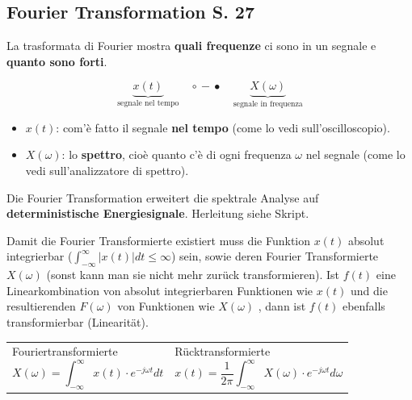 \subsection{Fourier Transformation S. 27}

La trasformata di Fourier mostra \textbf{quali frequenze} ci sono in un segnale
e \textbf{quanto sono forti}.

\[
\underbrace{x(t)}_{\text{segnale nel tempo}}
\quad \circ\!\!-\!\!\bullet \quad
\underbrace{X(\omega)}_{\text{segnale in frequenza}}
\]

\begin{itemize}
  \item $x(t)$: com'è fatto il segnale \textbf{nel tempo} (come lo vedi sull'oscilloscopio).
  \item $X(\omega)$: lo \textbf{spettro}, cioè quanto c'è di ogni frequenza $\omega$ nel segnale
        (come lo vedi sull'analizzatore di spettro).
\end{itemize}

Die Fourier Transformation erweitert die spektrale Analyse auf \textbf{deterministische Energiesignale}. Herleitung siehe Skript.

Damit die Fourier Transformierte existiert muss die Funktion $x(t)$ absolut integrierbar ($\int_{-\infty}^{\infty} |x(t)| dt \leq \infty$) sein, sowie deren Fourier Transformierte $X(\omega)$ (sonst kann man sie nicht mehr zurück transformieren). Ist $f(t)$ eine Linearkombination von absolut integrierbaren Funktionen wie $x(t)$ und die resultierenden $F(\omega)$ von Funktionen wie $X(\omega)$ , dann ist $f(t)$ ebenfalls transformierbar (Linearität).
\begin{table}[H]
	\begin{tabularx}{\textwidth}{X X}
		\begin{minipage}{\linewidth}
			Fouriertransformierte
			\begin{equation*}
				X(\omega) = \int_{-\infty}^{\infty} x(t) \cdot e^{-j\omega t}dt
			\end{equation*}
		\end{minipage}
		&
		\begin{minipage}{\linewidth}
			Rücktransformierte
			\begin{equation*}
				x(t) = \frac{1}{2\pi}\int_{-\infty}^{\infty} X(\omega) \cdot e^{-j\omega t}d\omega
			\end{equation*}
	\end{minipage}
	\end{tabularx}
\end{table}

